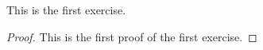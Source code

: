 \begin{exercise}
    This is the first exercise.
\end{exercise}
\begin{proof}
    This is the first proof of the first exercise.
\end{proof}